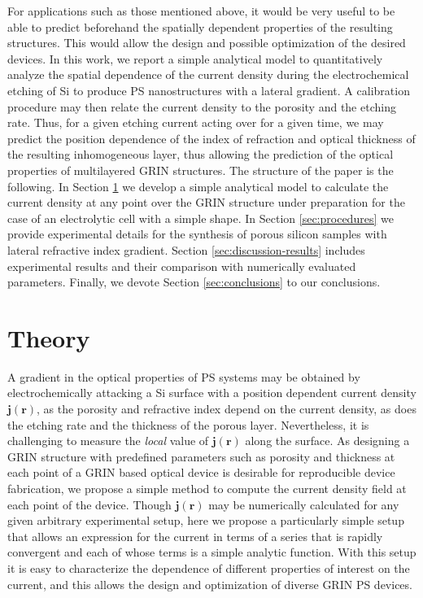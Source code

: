 \documentclass[review,sort&compress]{cas-sc}
\begin{document}
For applications such as those mentioned above,
it would be very useful to be able to predict beforehand the spatially dependent
properties of the resulting structures. This would allow the design
and possible optimization of the desired devices.
In this work, we report a simple analytical model to quantitatively
analyze the spatial dependence of the current density during the
electrochemical etching of Si to produce PS nanostructures with a
lateral gradient. A calibration
procedure may then relate the current density to the porosity and the
etching rate. Thus, for a given etching current acting over for a given
time, we may predict the position dependence of the index of
refraction and optical thickness of the resulting inhomogeneous
layer, thus allowing the prediction of the optical properties of
multilayered GRIN structures. The structure of the paper is the
following.
In Section \ref{sec:theory} we develop a
simple analytical model to calculate
the current density at any point over the GRIN structure under
preparation for the case of an electrolytic cell with a simple shape.
In Section \ref{sec:procedures} we provide experimental details for the
synthesis of porous silicon samples with lateral refractive index gradient.
Section \ref{sec:discussion-results} includes experimental results and
their comparison with numerically evaluated parameters. Finally, we
devote Section \ref{sec:conclusions} to our conclusions.


\section{Theory}
\label{sec:theory}
\label{sec:calc-curr-dens}
A gradient in the optical properties of PS systems may be
obtained by electrochemically attacking a Si surface with a position dependent current
density ${\bm j(\bm r)}$, as the porosity and refractive index depend on
the current density, as does the etching rate and the thickness of the
porous layer. Nevertheless, it is challenging to measure the
{\em local} value of $\bm j(\bm r)$ along the surface. As
designing a GRIN structure with predefined parameters such as porosity
and thickness at each point of a GRIN based optical device is desirable
for reproducible device fabrication, we
propose a simple method to compute the current density field at each point
of the device.
Though $\bm j(\bm r)$ may be numerically calculated for any
given arbitrary experimental setup,  here we propose a particularly
simple setup that allows an expression for the current in terms
of a series that is rapidly convergent and each of whose terms is a
simple analytic function. With this setup it is easy to characterize
the dependence of different properties of interest on the current, and
this allows the design and optimization of diverse GRIN PS devices.
\end{document}

